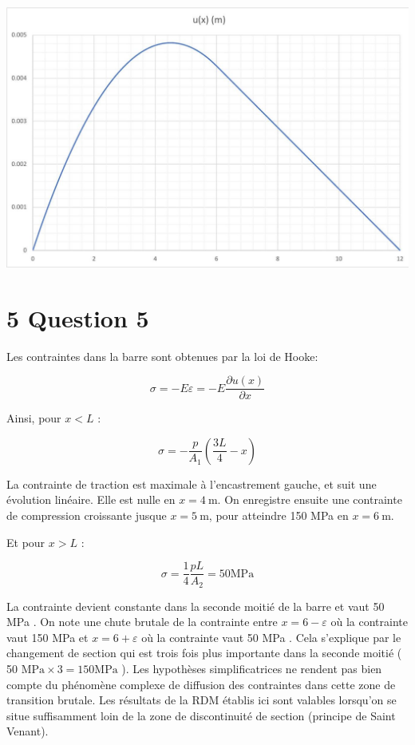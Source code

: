 \documentclass[11pt,a4paper]{report}
\begin{document}
{\begin{center}
\includegraphics[max width=\textwidth]{2025_10_03_26e11264345fd9bad5cag-5}
\end{center}

\section*{5 Question 5}
Les contraintes dans la barre sont obtenues par la loi de Hooke:

$$
\sigma=-E \varepsilon=-E \frac{\partial u(x)}{\partial x}
$$

Ainsi, pour $x<L$ :

$$
\sigma=-\frac{p}{A_{1}}\left(\frac{3 L}{4}-x\right)
$$

La contrainte de traction est maximale à l'encastrement gauche, et suit une évolution linéaire. Elle est nulle en $x=4 \mathrm{~m}$. On enregistre ensuite une contrainte de compression croissante jusque $x=5 \mathrm{~m}$, pour atteindre 150 MPa en $x=6 \mathrm{~m}$.

Et pour $x>L$ :

$$
\sigma=\frac{1}{4} \frac{p L}{A_{2}}=50 \mathrm{MPa}
$$

La contrainte devient constante dans la seconde moitié de la barre et vaut 50 MPa . On note une chute brutale de la contrainte entre $x=6-\varepsilon$ où la contrainte vaut 150 MPa et $x=6+\varepsilon$ où la contrainte vaut 50 MPa . Cela s'explique par le changement de section qui est trois fois plus importante dans la seconde moitié ( 50 $\mathrm{MPa} \times 3=150 \mathrm{MPa}$ ). Les hypothèses simplificatrices ne rendent pas bien compte du phénomène complexe de diffusion des contraintes dans cette zone de transition brutale. Les résultats de la RDM établis ici sont valables lorsqu'on se situe suffisamment loin de la zone de discontinuité de section (principe de Saint Venant).

}
\end{document}
